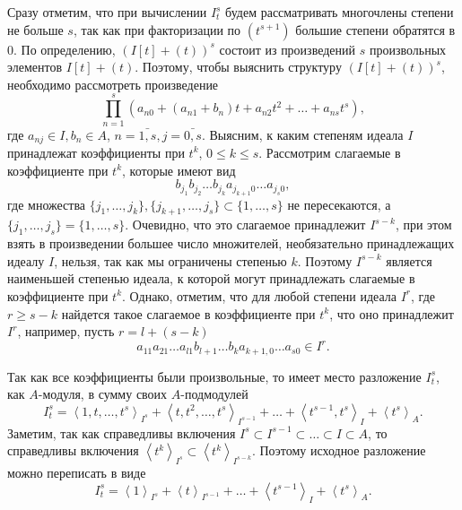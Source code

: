     \begin{Proof}
        Сразу отметим, что при вычислении $I^s_t$ будем рассматривать многочлены степени не больше $s$,
        так как при факторизации по $(t^{s + 1})$ большие степени обратятся в 0. 
        По определению, $(I[t] + (t))^s$ состоит из произведений $s$ произвольных
        элементов $I[t] + (t)$. Поэтому, чтобы выяснить структуру $(I[t] + (t))^s$, необходимо рассмотреть
        произведение
        \begin{equation*}
            \prod_{n = 1}^s \left( a_{n0} + (a_{n1} + b_n)t + a_{n2}t^2 + \dots + a_{ns}t^s \right),
        \end{equation*}
        где $a_{nj} \in I, b_n \in A$, $n = \bar{1, s}, j = \bar{0, s}$.
        Выясним, к каким степеням идеала $I$ принадлежат коэффициенты при $t^k$, $0 \leq k \leq s$.
        Рассмотрим слагаемые в коэффициенте при $t^k$, которые имеют вид
        \begin{equation*}
            b_{j_1}b_{j_2}\dots  b_{j_k}a_{j_{k+1}0}\dots a_{j_s0},
        \end{equation*}
        где множества $\{j_1, \dots, j_k\}, \{j_{k+1}, \dots, j_s\} \subset \{1, \dots, s\}$ не пересекаются, а
        $\{j_1, \dots, j_s\} = \{1, \dots, s\}$. Очевидно, что это слагаемое принадлежит $I^{s - k}$,
        при этом взять в произведении большее число множителей, необязательно принадлежащих идеалу $I$, 
        нельзя, так как мы ограничены степенью $k$. Поэтому
        $I^{s - k}$ является наименьшей степенью идеала, к которой могут принадлежать слагаемые в коэффициенте при $t^k$.
        Однако, отметим, что для любой степени идеала $I^r$, где $r \geq s - k$ найдется такое слагаемое 
        в коэффициенте при $t^k$, что оно принадлежит $I^r$, например, пусть $r = l + (s - k)$
        \begin{equation*}
            a_{11}a_{21}\dots a_{l1}b_{l + 1}\dots b_k a_{k + 1, 0}\dots a_{s0} \in I^r.
        \end{equation*}

        Так как все коэффициенты были произвольные, то имеет место разложение $I^s_t$, как $A$-модуля, 
        в сумму своих $A$-подмодулей
        \begin{equation*}
            I^s_t = \left< 1, t, \dots, t^s \right>_{I^s} + 
            \left< t, t^2, \dots, t^s \right>_{I^{s-1}} + 
            \dots +
            \left< t^{s-1}, t^s \right>_{I} + 
            \left< t^s \right>_A.
        \end{equation*}
        Заметим, так как справедливы включения $I^s \subset I^{s - 1} \subset \dots \subset I \subset A$,
        то справедливы включения $\left< t^k \right>_{I^s} \subset \left< t^k \right>_{I^{s - k}}$. 
        Поэтому исходное разложение можно переписать в виде
        \begin{equation*}
            I^s_t = \left< 1  \right>_{I^s} + 
                    \left< t \right>_{I^{s-1}} + 
                    \dots +
                    \left< t^{s-1} \right>_{I} + 
                    \left< t^s \right>_A.
        \end{equation*}
    \end{Proof}
